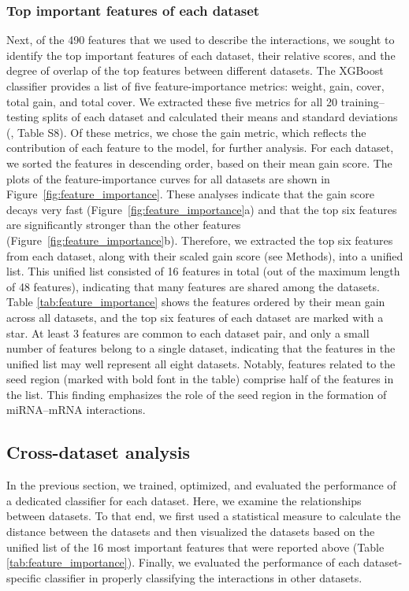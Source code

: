 \documentclass{bmcart}
\begin{document}
\subsubsection*{Top important features of each dataset}
Next, of the 490 features that we used to describe the interactions, we sought to identify the top important features of each dataset, their relative scores, and the degree of overlap of the top features between different datasets. The XGBoost classifier provides a list of five feature-importance metrics: weight, gain, cover, total gain, and total cover. We extracted these five metrics for all 20 training--testing splits of each dataset and calculated their means and standard deviations (, Table S8).
Of these metrics, we chose the gain metric, which reflects the contribution of each feature to the model, for further analysis. For each dataset, we sorted the features in descending order, based on their mean gain score. The plots of the feature-importance curves for all datasets are shown in Figure~\ref{fig:feature_importance}.
These analyses indicate that the gain score decays very fast (Figure~\ref{fig:feature_importance}a) and that the top six features are significantly stronger than the other features (Figure~\ref{fig:feature_importance}b). Therefore, we extracted the top six features from each dataset, along with their scaled gain score (see Methods), into a unified list. This unified list consisted of 16 features in total (out of the maximum length of 48 features), indicating that many features are shared among the datasets. Table \ref{tab:feature_importance} shows the features ordered by their mean gain across all datasets, and the top six features of each dataset are marked with a star. At least 3 features are common to each dataset pair, and only a small number of features belong to a single dataset, indicating that the features in the unified list may well represent all eight datasets.
Notably, features related to the seed region (marked with bold font in the table) comprise half of the features in the list. This finding emphasizes the role of the seed region in the formation of miRNA--mRNA interactions.



\subsection*{Cross-dataset analysis}
In the previous section, we trained, optimized, and evaluated the performance of a dedicated classifier for each dataset. Here, we examine the relationships between datasets. To that end, we first used a statistical measure to calculate the distance between the datasets and then visualized the datasets based on the unified list of the 16 most important features that were reported above (Table \ref{tab:feature_importance}). Finally, we evaluated the performance of each dataset-specific classifier in properly classifying the interactions in other datasets.
\end{document}
